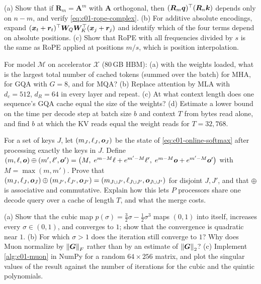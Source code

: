 \begin{exercise}\label{ex:c01-rope-relative}
(a) Show that if $\bm{R}_m = \bm{A}^m$ with $\bm{A}$ orthogonal, then
$(\bm{R}_m\bm{q})^{\top}(\bm{R}_n\bm{k})$ depends only on $n - m$, and verify
\eqref{eq:c01-rope-complex}. (b) For additive absolute encodings, expand
$(\bm{x}_t + \bm{r}_t)^{\top}\bm{W}_Q\bm{W}_K^{\top}(\bm{x}_j + \bm{r}_j)$ and identify which of the four terms depend on
absolute positions. (c) Show that RoPE with all frequencies divided by $s$ is the same as
RoPE applied at positions $m/s$, which is position interpolation.
\end{exercise}

\begin{exercise}\label{ex:c01-kv-budget}
For model $\mathcal{M}$ on accelerator $\mathcal{X}$ ($80$\,GB HBM): (a) with the weights
loaded, what is the largest total number of cached tokens (summed over the batch) for MHA,
for GQA with $G = 8$, and for MQA? (b) Replace attention by MLA with $d_c = 512$, $d_R = 64$ in
every layer and repeat. (c) At what context length does one sequence's GQA cache equal the
size of the weights? (d) Estimate a lower bound on the time per decode step at batch size
$b$ and context $T$ from bytes read alone, and find $b$ at which the KV reads equal the weight
reads for $T = 32{,}768$.
\end{exercise}

\begin{exercise}\label{ex:c01-merge}
For a set of keys $J$, let $(m_J, \ell_J, \bm{o}_J)$ be the state of \eqref{eq:c01-online-softmax}
after processing exactly the keys in $J$. Define
$(m, \ell, \bm{o})\oplus(m', \ell', \bm{o}') = \bigl(M,\; e^{m-M}\ell + e^{m'-M}\ell',\;
e^{m-M}\bm{o} + e^{m'-M}\bm{o}'\bigr)$ with $M = \max(m, m')$. Prove that
$(m_J, \ell_J, \bm{o}_J)\oplus(m_{J'}, \ell_{J'}, \bm{o}_{J'}) = (m_{J\cup J'}, \ell_{J\cup J'},
\bm{o}_{J\cup J'})$ for disjoint $J, J'$, and that $\oplus$ is associative and commutative.
Explain how this lets $P$ processors share one decode query over a cache of length $T$, and
what the merge costs.
\end{exercise}

\begin{exercise}\label{ex:c01-ns}
(a) Show that the cubic map $p(\sigma) = \tfrac{3}{2}\sigma - \tfrac{1}{2}\sigma^3$ maps
$(0, 1)$ into itself, increases every $\sigma \in (0,1)$, and converges to $1$; show that the
convergence is quadratic near $1$. (b) For which $\sigma > 1$ does the iteration still
converge to $1$? Why does Muon normalize by $\left\lVert \bm{G}\right\rVert_F$ rather than by an estimate of
$\left\lVert \bm{G}\right\rVert_2$? (c) Implement \cref{alg:c01-muon} in NumPy for a random $64\times 256$
matrix, and plot the singular values of the result against the number of iterations for the
cubic and the quintic polynomials.
\end{exercise}

